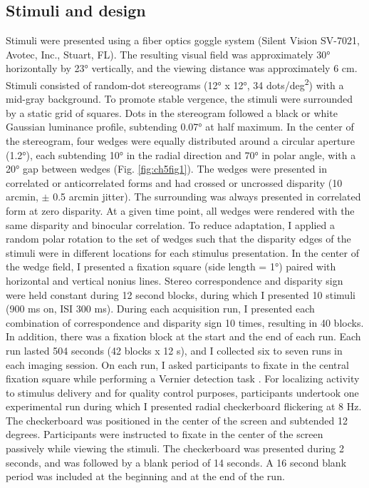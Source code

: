 \subsection{Stimuli and design}
Stimuli were presented using a fiber optics goggle system (Silent Vision SV-7021, Avotec, Inc., Stuart, FL). The resulting visual field was approximately \ang{30} horizontally by \ang{23} vertically, and the viewing distance was approximately 6 cm. Stimuli consisted of random-dot stereograms (\ang{12} x \ang{12}, 34 dots/deg\textsuperscript{2}) with a mid-gray background. To promote stable vergence, the stimuli were surrounded by a static grid of squares. Dots in the stereogram followed a black or white Gaussian luminance profile, subtending \ang{0.07} at half maximum. In the center of the stereogram, four wedges were equally distributed around a circular aperture (\ang{1.2}), each subtending \ang{10} in the radial direction and \ang{70} in polar angle, with a \ang{20} gap between wedges (Fig. \ref{fig:ch5fig1}). The wedges were presented in correlated or anticorrelated forms and had crossed or uncrossed disparity (10 arcmin, $\pm$ 0.5 arcmin jitter). The surrounding was always presented in correlated form at zero disparity. At a given time point, all wedges were rendered with the same disparity and binocular correlation. To reduce adaptation, I applied a random polar rotation to the set of wedges such that the disparity edges of the stimuli were in different locations for each stimulus presentation. In the center of the wedge field, I presented a fixation square (side length =  \ang{1}) paired with horizontal and vertical nonius lines.
Stereo correspondence and disparity sign were held constant during 12 second blocks, during which I presented 10 stimuli (900 ms on, ISI 300 ms). During each acquisition run, I presented each combination of correspondence and disparity sign 10 times, resulting in 40 blocks. In addition, there was a fixation block at the start and the end of each run. Each run lasted 504 seconds (42 blocks x 12 s), and I collected six to seven runs in each imaging session. On each run, I asked participants to fixate in the central fixation square while performing a Vernier detection task \cite{Preston:2008dg}.
For localizing activity to stimulus delivery and for quality control purposes, participants undertook one experimental run during which I presented radial checkerboard flickering at 8 Hz. The checkerboard was positioned in the center of the screen and subtended 12 degrees. Participants were instructed to fixate in the center of the screen passively while viewing the stimuli. The checkerboard was presented during 2 seconds, and was followed by a blank period of 14 seconds. A 16 second blank period was included at the beginning and at the end of the run.


